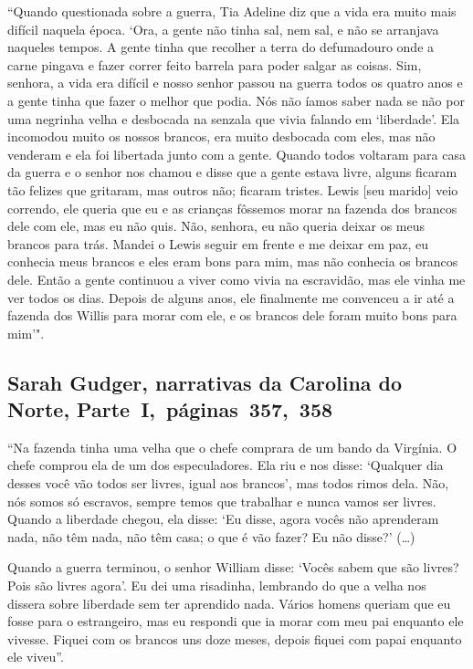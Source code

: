 ``Quando questionada sobre a guerra, Tia Adeline diz que a vida era
muito mais difícil naquela época. `Ora, a gente não tinha sal, nem sal,
e não se arranjava naqueles tempos. A gente tinha que recolher a terra
do defumadouro onde a carne pingava e fazer correr feito barrela para
poder salgar as coisas. Sim, senhora, a vida era difícil e nosso senhor
passou na guerra todos os quatro anos e a gente tinha que fazer o melhor
que podia. Nós não íamos saber nada se não por uma negrinha velha e
desbocada na senzala que vivia falando em `liberdade'. Ela incomodou
muito os nossos brancos, era muito desbocada com eles, mas não venderam
e ela foi libertada junto com a gente. Quando todos voltaram para casa
da guerra e o senhor nos chamou e disse que a gente estava livre, alguns
ficaram tão felizes que gritaram, mas outros não; ficaram tristes. Lewis
{[}seu marido{]} veio correndo, ele queria que eu e as crianças fôssemos
morar na fazenda dos brancos dele com ele, mas eu não quis. Não,
senhora, eu não queria deixar os meus brancos para trás. Mandei o Lewis
seguir em frente e me deixar em paz, eu conhecia meus brancos e eles
eram bons para mim, mas não conhecia os brancos dele. Então a gente
continuou a viver como vivia na escravidão, mas ele vinha me ver todos
os dias. Depois de alguns anos, ele finalmente me convenceu a ir até a
fazenda dos Willis para morar com ele, e os brancos dele foram muito
bons para mim'".

\subsection{Sarah Gudger, narrativas da Carolina do Norte, Parte~I,~páginas~357,~358}
\label{ref116}

``Na fazenda tinha uma velha que o chefe comprara de um bando da
Virgínia. O chefe comprou ela de um dos especuladores. Ela riu e nos
disse: `Qualquer dia desses você vão todos ser livres, igual aos
brancos', mas todos rimos dela. Não, nós somos só escravos, sempre temos
que trabalhar e nunca vamos ser livres. Quando a liberdade chegou, ela
disse: `Eu disse, agora vocês não aprenderam nada, não têm nada, não têm
casa; o que é vão fazer? Eu não disse?' (\ldots{})

Quando a guerra terminou, o senhor William disse: `Vocês sabem que são
livres? Pois são livres agora'. Eu dei uma risadinha, lembrando do que a
velha nos dissera sobre liberdade sem ter aprendido nada. Vários homens
queriam que eu fosse para o estrangeiro, mas eu respondi que ia morar
com meu pai enquanto ele vivesse. Fiquei com os brancos uns doze meses,
depois fiquei com papai enquanto ele viveu''.

